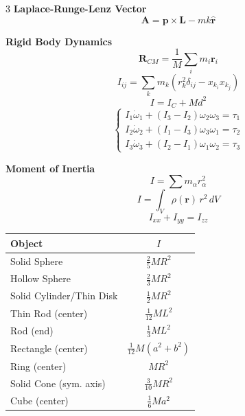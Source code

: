 \documentclass[1pt]{article}
\begin{document}
\begin{multicols}{3}
\textbf{Laplace-Runge-Lenz Vector}
\begin{equation*}
    \mathbf{A} = \mathbf{p} \times \mathbf{L} - m k \hat{\mathbf{r}}
\end{equation*}

\textbf{Rigid Body Dynamics}
\begin{equation*}
    \mathbf{R}_{CM} = \frac{1}{M} \sum_i m_i \mathbf{r}_i
\end{equation*}
\begin{equation*}
    I_{ij} = \sum_k m_k \left( r_k^2 \delta_{ij} - x_{k_i} x_{k_j} \right)
\end{equation*}
\begin{equation*}
    I = I_C + Md^2
\end{equation*}
\begin{equation*}
\begin{cases}
    I_1 \dot{\omega}_1 + (I_3 - I_2) \omega_2 \omega_3 = \tau_1 \\
    I_2 \dot{\omega}_2 + (I_1 - I_3) \omega_3 \omega_1 = \tau_2 \\
    I_3 \dot{\omega}_3 + (I_2 - I_1) \omega_1 \omega_2 = \tau_3
\end{cases}
\end{equation*}


\textbf{Moment of Inertia }
\begin{equation}
    I = \sum m_{\alpha} r_{\alpha}^2
\end{equation}
\[I = \int_V \rho(\mathbf{r})\, r^2\, dV\]
\begin{equation*}
    I_{xx} + I_{yy} = I_{zz}
\end{equation*}
\centering
\renewcommand{\arraystretch}{1.2}
\setlength{\tabcolsep}{3pt}
\renewcommand{\arraystretch}{1.1}
\begin{tabular}{|l |c|}
\toprule
\textbf{Object} & \textbf{\(I\)} \\
\midrule
Solid Sphere & \(\frac{2}{5}MR^2\)\\[2mm] \hline 
Hollow Sphere & \(\frac{2}{3}MR^2\)\\[2mm] \hline 
Solid Cylinder/Thin Disk & \(\frac{1}{2}MR^2\)\\[2mm] \hline 
Thin Rod (center) & \(\frac{1}{12}ML^2\)\\[2mm] \hline 
Rod (end) & \(\frac{1}{3}ML^2\)\\[2mm] \hline 
Rectangle (center) & \(\frac{1}{12}M(a^2+b^2)\)\\[2mm] \hline 
Ring (center) & \(MR^2\)\\[2mm] \hline 
Solid Cone (sym. axis) & \(\frac{3}{10}MR^2\)\\[2mm]
Cube (center) & \(\frac{1}{6}Ma^2\)\\
\bottomrule \hline
\end{tabular}


\end{multicols}
\end{document}
